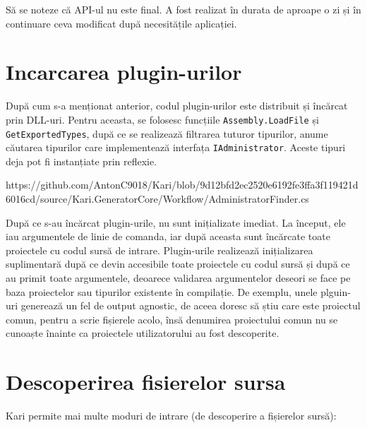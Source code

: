 \documentclass[a4paper,12pt]{report}
\begin{document}
Să se noteze că API-ul nu este final.
A fost realizat în durata de aproape o zi și în continuare ceva modificat după necesitățile aplicației.


\section{Incarcarea plugin-urilor}

După cum s-a menționat anterior, codul plugin-urilor este distribuit și încărcat prin DLL-uri.
Pentru aceasta, se folosesc funcțiile \texttt{Assembly.LoadFile} și \texttt{GetExportedTypes}, după ce se realizează filtrarea tuturor tipurilor, anume căutarea tipurilor care implementează interfața \texttt{IAdministrator}.
Aceste tipuri deja pot fi instanțiate prin reflexie.

https://github.com/AntonC9018/Kari/blob/9d12bfd2ec2520e6192fe3ffa3f119421d6016cd/source/Kari.GeneratorCore/Workflow/AdministratorFinder.cs

După ce s-au încărcat plugin-urile, nu sunt inițializate imediat.
La început, ele iau argumentele de linie de comanda, iar după aceasta sunt încărcate toate proiectele cu codul sursă de intrare.
Plugin-urile realizează inițializarea suplimentară după ce devin accesibile toate proiectele cu codul sursă și după ce au primit toate argumentele, deoarece validarea argumentelor deseori se face pe baza proiectelor sau tipurilor existente în compilație.
De exemplu, unele plguin-uri generează un fel de output agnostic, de aceea doresc să știu care este proiectul comun, pentru a scrie fișierele acolo, însă denumirea proiectului comun nu se cunoaște înainte ca proiectele utilizatorului au fost descoperite.

\section{Descoperirea fisierelor sursa}

Kari permite mai multe moduri de intrare (de descoperire a fișierelor sursă):
\end{document}
